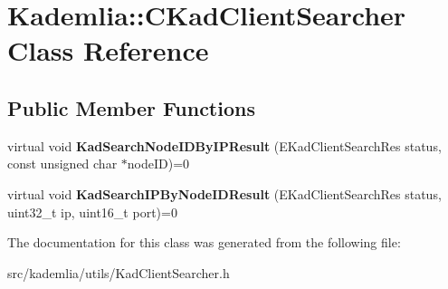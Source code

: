 \section{Kademlia::CKadClientSearcher Class Reference}
\label{classKademlia_1_1CKadClientSearcher}
\subsection*{Public Member Functions}
\begin{DoxyCompactItemize}
\item 
virtual void {\bfseries KadSearchNodeIDByIPResult} (EKadClientSearchRes status, const unsigned char $\ast$nodeID)=0\label{classKademlia_1_1CKadClientSearcher_ad8d5625cc3a916021d8e444c4e3d8a23}

\item 
virtual void {\bfseries KadSearchIPByNodeIDResult} (EKadClientSearchRes status, uint32\_\-t ip, uint16\_\-t port)=0\label{classKademlia_1_1CKadClientSearcher_af663e19455e9984b1772ae6fb273835c}

\end{DoxyCompactItemize}


The documentation for this class was generated from the following file:\begin{DoxyCompactItemize}
\item 
src/kademlia/utils/KadClientSearcher.h\end{DoxyCompactItemize}
